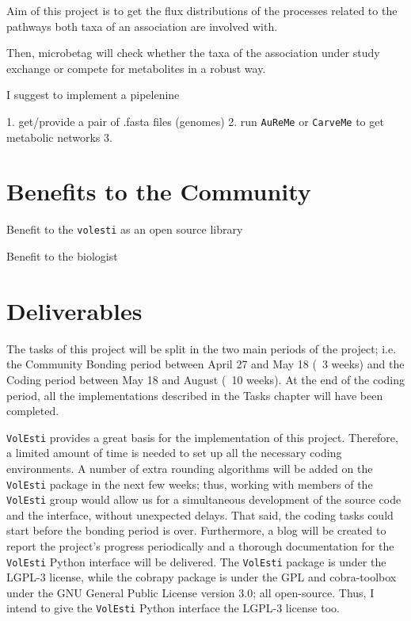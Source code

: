 \documentclass{article}
\begin{document}
Aim of this project is to get the flux distributions of the processes related to the pathways both taxa of an association are involved with. 

Then, microbetag will check whether the taxa of the association under study exchange or compete for metabolites in a robust way.






I suggest to implement a pipelenine 

1. get/provide a pair of .fasta files (genomes)
2. run \texttt{AuReMe} or \texttt{CarveMe} to get metabolic networks
3. 




\section{Benefits to the Community}

Benefit to the \texttt{volesti} as an open source library

Benefit to the biologist 

\section{Deliverables}
The tasks of this project will be split in the two main periods of the project; i.e. the Community Bonding period between April 27 and May 18 (~3 weeks) and the Coding period between May 18 and August (~10 weeks). 
At the end of the coding period, all the implementations described in the Tasks chapter will have been completed. 

\texttt{VolEsti} provides a great basis for the implementation of this project. 
Therefore, a limited amount of time is needed  to set up all the necessary coding environments. 
A number of extra rounding algorithms will be added on the \texttt{VolEsti} package in the next few weeks; thus, working with members of the \texttt{VolEsti} group would allow us for a simultaneous  development of the source code and the interface, without unexpected delays. That said, the coding tasks could start before the bonding period is over. 
Furthermore, a blog will be created to report the project’s progress periodically and a thorough documentation for the \texttt{VolEsti} Python interface will be delivered. The \texttt{VolEsti} package is under the LGPL-3 license, while the cobrapy package is under the GPL and cobra-toolbox under the GNU General Public License version 3.0; all open-source. Thus, I intend to give the  \texttt{VolEsti} Python interface the LGPL-3 license too. 
\end{document}
